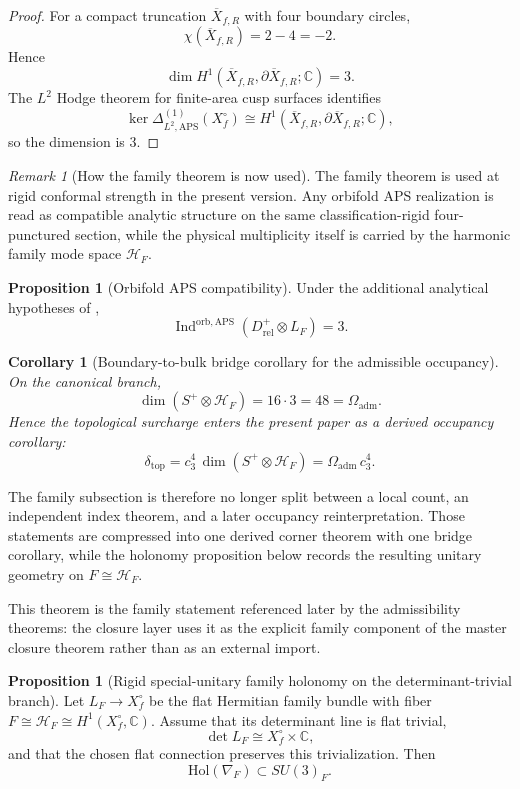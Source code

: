 \documentclass[11pt,a4paper]{article}
\newtheorem{corollary}[theorem]{Corollary}
\theoremstyle{definition}
\newtheorem{proposition}[theorem]{Proposition}
\theoremstyle{remark}
\newtheorem*{remark}{Remark}
\DeclareMathOperator{\Ind}{Ind}
\newcommand{\cthree}{c_3}
\newcommand{\deltatop}{\delta_{\mathrm{top}}}
\newcommand{\Oadm}{\Omega_{\mathrm{adm}}}
\begin{document}
\begin{proof}
For a compact truncation $\overline X_{f,R}$ with four boundary circles,
\[
\chi(\overline X_{f,R})=2-4=-2.
\]
Hence
\[
\dim H^1(\overline X_{f,R},\partial\overline X_{f,R};\mathbb C)=3.
\]
The $L^2$ Hodge theorem for finite-area cusp surfaces identifies
\[
\ker \Delta^{(1)}_{L^2,\mathrm{APS}}(X_f^\circ)
\cong
H^1(\overline X_{f,R},\partial\overline X_{f,R};\mathbb C),
\]
so the dimension is $3$.
\end{proof}

\begin{remark}[How the family theorem is now used]
The family theorem is used at rigid conformal strength in the present version. Any orbifold APS
realization is read as compatible analytic structure on the same classification-rigid
four-punctured section, while the physical multiplicity itself is carried by the harmonic family
mode space $\mathcal H_F$.
\end{remark}

\begin{proposition}[Orbifold APS compatibility]
\label{prop:orbifold-aps-compatibility}
Under the additional analytical hypotheses of ,
\[
\Ind^{\mathrm{orb,APS}}(D_{\mathrm{rel}}^+\otimes L_F)=3.
\]
\end{proposition}

\begin{corollary}[Boundary-to-bulk bridge corollary for the admissible occupancy]
\label{cor:boundary-bulk-occupancy}
\label{cor:derived-occupancy-identity}
On the canonical branch,
\[
\dim(S^+\otimes \mathcal H_F)=16\cdot 3=48=\Oadm.
\]
Hence the topological surcharge enters the present paper as a derived occupancy corollary:
\[
\deltatop
=
\cthree^4\,\dim(S^+\otimes \mathcal H_F)
=
\Oadm\,\cthree^4.
\]
\end{corollary}

The family subsection is therefore no longer split between a local count, an independent index
theorem, and a later occupancy reinterpretation. Those statements are compressed into one derived
corner theorem with one bridge corollary, while the holonomy proposition below records the
resulting unitary geometry on $F\cong \mathcal H_F$.

This theorem is the family statement referenced later by the admissibility theorems: the closure layer uses it as the explicit family component of the master closure theorem rather than as an external import.

\begin{proposition}[Rigid special-unitary family holonomy on the determinant-trivial branch]
\label{prop:family-holonomy-su3}
Let $L_F\to X_f^\circ$ be the flat Hermitian family bundle with fiber
$F\cong \mathcal H_F\cong H^1(X_f^\circ,\mathbb C)$. Assume that its determinant line is flat trivial,
\[
\det L_F \cong X_f^\circ\times \mathbb C,
\]
and that the chosen flat connection preserves this trivialization. Then
\[
\mathrm{Hol}(\nabla_F)\subset SU(3)_F.
\]
\end{proposition}
\end{document}
